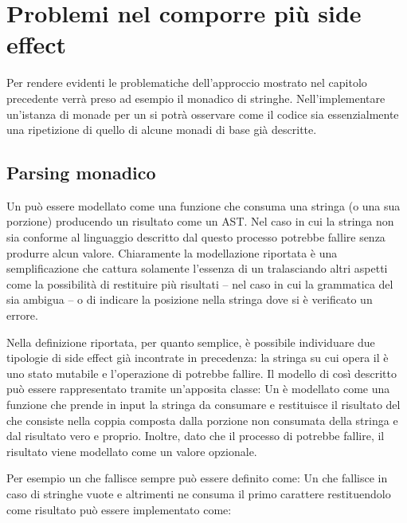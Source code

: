 \section{Problemi nel comporre più side effect}

Per rendere evidenti le problematiche dell'approccio mostrato nel capitolo precedente verrà preso ad esempio il  monadico di stringhe.
Nell'implementare un'istanza di monade per un  si potrà osservare come il codice sia essenzialmente una ripetizione di quello di alcune monadi di base già descritte.

\subsection{Parsing monadico}
\label{sec:parsing-monadico}
Un  può essere modellato come una funzione che consuma una stringa (o una sua porzione) producendo un risultato come un \ac{AST}. Nel caso in cui la stringa non sia conforme al linguaggio descritto dal  questo processo potrebbe fallire senza produrre alcun valore.
Chiaramente la modellazione riportata è una semplificazione che cattura solamente l'essenza di un  tralasciando altri aspetti come la possibilità di restituire più risultati -- nel caso in cui la grammatica del  sia ambigua -- o di indicare la posizione nella stringa dove si è verificato un errore.

Nella definizione riportata, per quanto semplice, è possibile individuare due tipologie di side effect già incontrate in precedenza: la stringa su cui opera il  è uno stato mutabile e l'operazione di  potrebbe fallire.
Il modello di  così descritto può essere rappresentato tramite un'apposita classe:
Un  è modellato come una funzione che prende in input la stringa da consumare e restituisce il risultato del  che consiste nella coppia composta dalla porzione non consumata della stringa e dal risultato vero e proprio. Inoltre, dato che il processo di  potrebbe fallire, il risultato viene modellato come un valore opzionale.

Per esempio un  che fallisce sempre può essere definito come:
Un  che fallisce in caso di stringhe vuote e altrimenti ne consuma il primo carattere restituendolo come risultato può essere implementato come:

